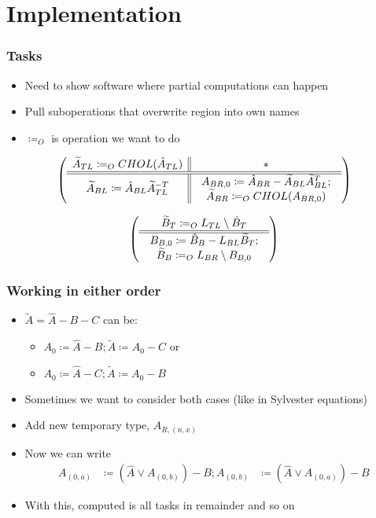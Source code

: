 \documentclass{beamer}
\begin{document}
\section{Implementation}

\frame{\sectionpage}

\begin{frame}
  \frametitle{Tasks}
  \begin{itemize}
  \item Need to show software where partial computations can happen
  \item Pull suboperations that overwrite region into own names
  \item $\coloneqq_O$ is operation we want to do
  \end{itemize}
  \begin{equation*}
    \left( \begin{array}{c || c} \widetilde{A}_{TL} \coloneqq_O CHOL(\hat{A}_{TL}) & * \\ \hline \hline \widetilde{A}_{BL} \coloneqq \hat{A}_{BL}\widetilde{A}_{TL}^{-T} & \begin{array}{c}
       A_{BR, 0} \coloneqq \hat{A}_{BR} - \widetilde{A}_{BL}\widetilde{A}_{BL}^T;\\
       \widetilde{A}_{BR} \coloneqq_O CHOL(A_{BR, 0})
     \end{array} \end{array} \right)
 \end{equation*}

 \begin{equation*}
   \left( \begin{array}{c} \widetilde{B}_T \coloneqq_O L_{TL} \setminus \hat{B}_T \\ \hline \hline \begin{array}{c}
      B_{B, 0} \coloneqq \hat{B}_B - L_{BL}\widetilde{B}_T;\\
      \widetilde{B}_B \coloneqq_O L_{BR} \setminus B_{B, 0}
    \end{array} \end{array} \right)
 \end{equation*}
\end{frame}

\begin{frame}
  \frametitle{Working in either order}
  \begin{itemize}
  \item $\widetilde{A} = \hat{A} - B - C$ can be:
    \begin{itemize}
    \item $A_0 \coloneqq \hat{A} - B; \widetilde{A} \coloneqq A_0 - C$ or
    \item $A_0 \coloneqq \hat{A} - C; \widetilde{A} \coloneqq A_0 - B$
    \end{itemize}

  \item Sometimes we want to consider both cases (like in Sylvester equations)
  \item Add new temporary type, $A_{R, (n, x)}$
  \item Now we can write
    \begin{align*}
      A_{(0, a)} &\coloneqq (\hat{A} \vee A_{(0, b)}) - B;
      A_{(0, b)} &\coloneqq (\hat{A} \vee A_{(0, a)}) - B
    \end{align*}
  \item With this, computed is all tasks in remainder and so on
  \end{itemize}
\end{frame}
\end{document}
